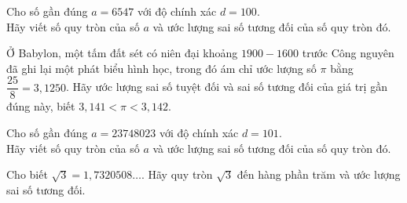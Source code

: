 \begin{vd}%
	Cho số gần đúng $ a =6547$ với độ chính xác $ d=100 $.\\
	Hãy viết số quy tròn của số $ a $ và ước lượng sai số tương đối của số quy tròn đó.
\end{vd}

\baitaptl
\setcounter{bt}{0}
\begin{bt}%
	Ở Babylon, một tấm đất sét có niên đại khoảng $ 1900-1600 $ trước Công nguyên đã ghi lại một phát biểu hình học, trong đó ám chỉ ước lượng số $ \pi $ bằng $ \dfrac{25}{8} =3{,}1250$. Hãy ước lượng sai số tuyệt đối và sai số tương đối của giá trị gần đúng này, biết $ 3{,}141<\pi<3{,}142 $.
\end{bt}

\begin{bt}%
	Cho số gần đúng $ a =23748023$ với độ chính xác $ d=101 $.\\
	Hãy viết số quy tròn của số $ a $ và ước lượng sai số tương đối của số quy tròn đó.
\end{bt}

\begin{bt}%
	Cho biết $\sqrt{3}=1{,}7320508\ldots$. Hãy quy tròn $ \sqrt{3} $ đến hàng phần trăm và ước lượng sai số tương đối.
	
\end{bt}


